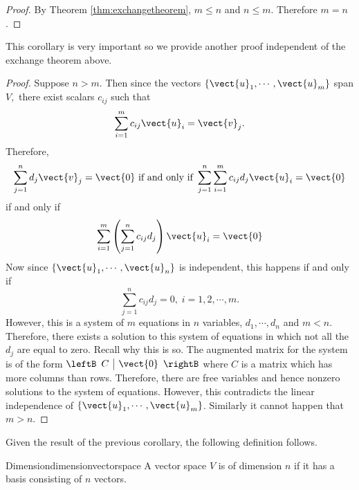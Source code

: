 \begin{proof} By Theorem \ref{thm:exchangetheorem}, $m\leq n$ and $n\leq m$. Therefore $m=n$. 
\end{proof}

This corollary is very important so we provide another proof independent of the exchange theorem above.

\begin{proof}Suppose $n > m.$ Then since the vectors $\left\{ \vect{u}
_{1},\cdots ,\vect{u}_{m}\right\} $ span $V,$ there exist scalars $c_{ij}$
such that 
\begin{equation*}
\sum_{i=1}^{m}c_{ij}\vect{u}_{i}=\vect{v}_{j}.
\end{equation*}
Therefore, 
\begin{equation*}
\sum_{j=1}^{n}d_{j}\vect{v}_{j}=\vect{0}
\text{ if and only if }\sum_{j=1}^{n}\sum_{i=1}^{m}c_{ij}d_{j}\vect{u}_{i}=
\vect{0}
\end{equation*}
if and only if 
\begin{equation*}
\sum_{i=1}^{m}\left( \sum_{j=1}^{n}c_{ij}d_{j}\right) \vect{u}_{i}=\vect{
0}
\end{equation*}
Now since $\{\vect{u}_{1},\cdots ,\vect{u}_{n}\}$ is independent, this
happens if and only if 
\begin{equation*}
\sum_{j=1}^{n}c_{ij}d_{j}=0,\;i=1,2,\cdots ,m.
\end{equation*}
However, this is a system of $m$ equations in $n$ variables, $d_{1},\cdots
,d_{n}$ and $m<n.$ Therefore, there exists a solution to this system of
equations in which not all the $d_{j}$ are equal to zero. Recall why this is
so. The augmented matrix for the system is of the form 
$\leftB 
\begin{array}{c|c}
C & \vect{0}
\end{array}
\rightB $ where $C$ is a matrix which has more columns than rows. Therefore,
there are free variables and hence nonzero solutions to the system of
equations. However, this contradicts the linear independence of $\left\{ 
\vect{u}_{1},\cdots ,\vect{u}_{m}\right\} $. Similarly it cannot happen
that $m > n$.
\end{proof}

Given the result of the previous corollary, the following definition follows.

\begin{definition}{Dimension}{dimensionvectorspace}
 A vector space $V$ is of dimension $n$ if it has a basis consisting of $n$ vectors.
\end{definition}

